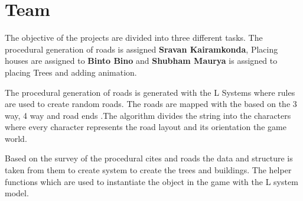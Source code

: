 \chapter{Team}

\Large The objective of the projects are divided into three different tasks. The procedural generation of roads is assigned \textbf{Sravan Kairamkonda}, Placing houses are assigned to \textbf{Binto Bino} and  \textbf{Shubham Maurya} is assigned to placing Trees and adding animation.

\vspace{0.5cm}

\Large The procedural generation of roads is generated with the L Systems where rules are used to create random roads. The roads are mapped with the based on the 3 way, 4 way and road ends \cite{galin2010procedural}.The algorithm divides the string into the characters where every character represents the road layout and its orientation the game world.

\vspace{0.5cm}

\Large Based on the survey of the procedural cites and roads \cite{de2011survey} \cite{kelly2006survey} the data and structure is taken from them to create system to create the trees and buildings. The helper functions which are used to instantiate the object in the game with the L system model.